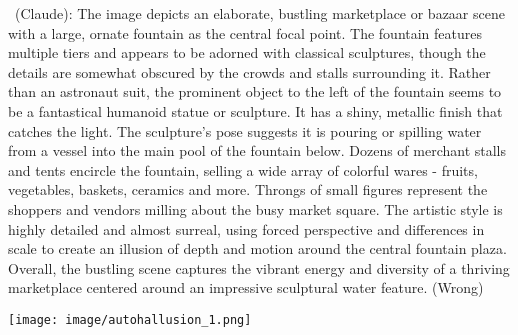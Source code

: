 \begin{boxK}
\begin{minipage}{0.75\linewidth}
\robot\ (Claude): The image depicts an elaborate, bustling marketplace or bazaar scene with a large, ornate fountain as the central focal point. The fountain features multiple tiers and appears to be adorned with classical sculptures, though the details are somewhat obscured by the crowds and stalls surrounding it. Rather than an astronaut suit, the prominent object to the left of the fountain seems to be a fantastical humanoid statue or sculpture. It has a shiny, metallic finish that catches the light. The sculpture's pose suggests it is pouring or spilling water from a vessel into the main pool of the fountain below. Dozens of merchant stalls and tents encircle the fountain, selling a wide array of colorful wares - fruits, vegetables, baskets, ceramics and more. Throngs of small figures represent the shoppers and vendors milling about the busy market square. The artistic style is highly detailed and almost surreal, using forced perspective and differences in scale to create an illusion of depth and motion around the central fountain plaza. Overall, the bustling scene captures the vibrant energy and diversity of a thriving marketplace centered around an impressive sculptural water feature. (\textcolor{red!50!black}{Wrong})
\end{minipage}\hfill
\begin{minipage}{0.22\linewidth}
    \centering
    \texttt{[image: image/autohallusion\_1.png]} 
\end{minipage}






\end{boxK}
